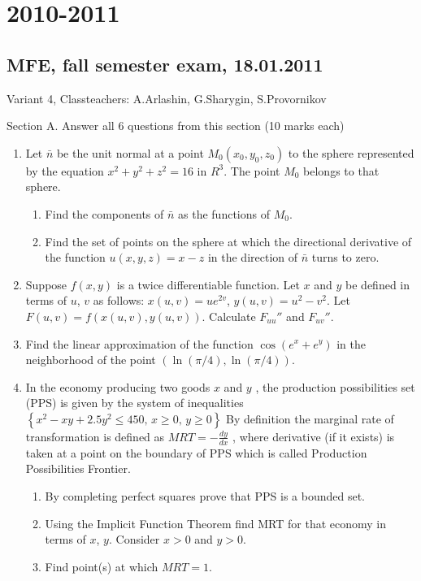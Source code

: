 \documentclass[12pt]{article} %
\theoremstyle{definition} %
\begin{document}
\section{2010-2011}

\subsection{MFE, fall semester exam, 18.01.2011}

Variant 4, Classteachers: A.Arlashin, G.Sharygin, S.Provornikov

Section A.
Answer all 6 questions from this section (10 marks each)

\begin{enumerate}
\item Let $\bar{n}$ be the unit normal at a point $M_0( x_0 , y_0 , z_0 )$ to the sphere represented by the equation $x^2+y^2+z^2=16$ in $R^3$. The point $M_0$ belongs to that sphere.
\begin{enumerate}
\item Find the components of $\bar{n}$ as the functions of $M_0$.
\item Find the set of points on the sphere at which the directional derivative of the function $u( x, y, z )=x-z$ in the direction of $\bar{n}$ turns to zero.
\end{enumerate}

\item Suppose $f(x,y)$ is a twice differentiable function. Let $x$ and $y$ be defined in terms of $u$, $v$ as follows: $x(u,v)=ue^{2v}$, $y(u,v)=u^2-v^2$. Let $F(u,v)=f(x(u, v), y(u, v))$.
Calculate $F_{uu}''$ and $F_{uv}''$.
\item Find the linear approximation of the function $\cos(e^x+e^y)$ in the neighborhood of the point $(\ln (\pi/4), \ln (\pi/4))$.

\item In the economy producing two goods $x$ and $y$ , the production possibilities set (PPS) is given by the system of inequalities
$ \left\{ x^2-xy+2.5y^2\leq 450, \, x\geq 0, \, y\geq 0 \right\} $
By definition the marginal rate of transformation is defined as
$ MRT=-\frac{dy}{dx}$
, where derivative (if it exists) is taken at a point on the boundary of PPS which is called Production Possibilities Frontier.
\begin{enumerate}
\item  By completing perfect squares prove that PPS is a bounded set.
\item Using the Implicit Function Theorem find MRT for that economy in terms of $x$, $y$. Consider $x>0$ and $y>0$.
\item Find point(s) at which $MRT=1$.
\end{enumerate}


\end{enumerate}
\end{document}
